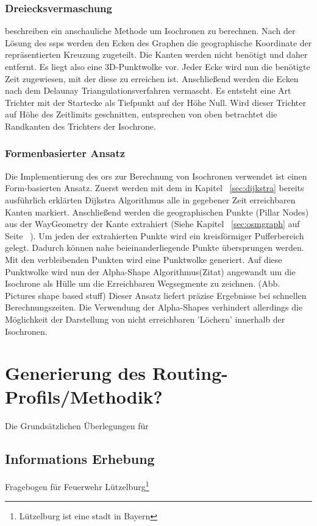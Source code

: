 \documentclass[12pt,a4paper]{article}
\begin{document}
\subsubsection{Dreiecksvermaschung}
\cite{isochrones} beschreiben ein anschauliche Methode um Isochronen zu berechnen. 
Nach der Lösung des \gls{ssp}s werden den Ecken des Graphen die geographische Koordinate der repräsentierten Kreuzung zugeteilt. Die Kanten werden nicht benötigt und daher entfernt. 
Es liegt also eine 3D-Punktwolke vor. 
Jeder Ecke wird nun die benötigte Zeit zugewiesen, mit der diese zu erreichen ist. 
Anschließend werden die Ecken nach dem Delaunay Triangulationsverfahren vermascht. 
Es entsteht eine Art Trichter mit der Startecke als Tiefpunkt auf der Höhe Null. 
Wird dieser Trichter auf Höhe des Zeitlimits geschnitten, entsprechen von oben betrachtet die Randkanten des Trichters der Isochrone.


\subsubsection{Formenbasierter Ansatz}
Die Implementierung des \gls{ors} zur Berechnung von Isochronen verwendet ist einen Form-basierten Ansatz. Zuerst werden mit dem in Kapitel ~\ref{sec:dijkstra} bereits ausführlich erklärten Dijkstra Algorithmus alle in gegebener Zeit erreichbaren Kanten markiert. Anschließend werden die geographischen Punkte (Pillar Nodes) aus der WayGeometry der Kante extrahiert (Siehe Kapitel ~\ref{sec:osmgraph} auf Seite ~\pageref{sec:osmgraph}). Um jeden der extrahierten Punkte wird ein kreisförmiger Pufferbereich gelegt. Dadurch können nahe beieinanderliegende Punkte übersprungen werden. Mit den verbleibenden Punkten wird eine Punktwolke generiert. Auf diese Punktwolke wird nun der Alpha-Shape Algorithmus(Zitat) angewandt um die Isochrone als Hülle um die Erreichbaren Wegsegmente zu zeichnen.
(Abb. Pictures shape based stuff)
Dieser Ansatz liefert präzise Ergebnisse bei schnellen Berechnungszeiten. Die Verwendung der Alpha-Shapes verhindert allerdings die Möglichkeit der Darstellung von nicht erreichbaren 'Löchern' innerhalb der Isochronen.

\newpage
\section{Generierung des Routing-Profils/Methodik?}
Die Grundsätzlichen Überlegungen für 
\subsection{Informations Erhebung}
Fragebogen für Feuerwehr Lützelburg\footnote{Lützelburg ist eine stadt in Bayern}
\end{document}
